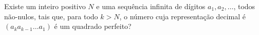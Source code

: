 Existe um inteiro positivo $N$ e uma sequência infinita de dígitos $a_1, a_2, \dots$, todos não-nulos, tais que, para todo $k > N$, o número cuja representação decimal é $(a_k a_{k-1} \dots a_1)$ é um quadrado perfeito?

